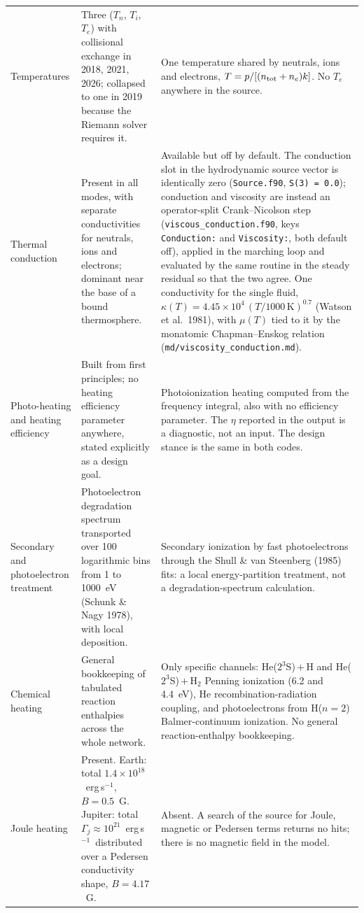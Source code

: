 \documentclass{my_memo}
\newcommand{\ergs}{erg\,s$^{-1}$}
\begin{document}
{\begin{longtable}{@{}L{0.155\textwidth}L{0.39\textwidth}L{0.39\textwidth}@{}}
Temperatures &
Three ($T_n$, $T_i$, $T_e$) with collisional exchange in 2018, 2021, 2026; collapsed to one in
2019 because the Riemann solver requires it. &
One temperature shared by neutrals, ions and electrons,
$T = p / [(n_{\rm tot} + n_e)k]$. No $T_e$ anywhere in the source. \\

Thermal conduction &
Present in all modes, with separate conductivities for neutrals, ions and electrons; dominant
near the base of a bound thermosphere. &
Available but off by default. The conduction slot in the hydrodynamic source vector is
identically zero (\texttt{Source.f90}, \texttt{S(3) = 0.0}); conduction and viscosity are
instead an operator-split Crank--Nicolson step
(\texttt{viscous\_conduction.f90}, keys \texttt{Conduction:} and \texttt{Viscosity:},
both default off), applied in the marching loop and evaluated by the same routine in the
steady residual so that the two agree. One conductivity for the single fluid,
$\kappa(T)=4.45\times10^{4}\,(T/1000\,\mathrm{K})^{0.7}$ (Watson et al.\ 1981), with
$\mu(T)$ tied to it by the monatomic Chapman--Enskog relation
(\texttt{md/viscosity\_conduction.md}). \\

Photo-heating and heating efficiency &
Built from first principles; no heating efficiency parameter anywhere, stated explicitly as a
design goal. &
Photoionization heating computed from the frequency integral, also with no efficiency parameter.
The $\eta$ reported in the output is a diagnostic, not an input. The design stance is the same in
both codes. \\

Secondary and photoelectron treatment &
Photoelectron degradation spectrum transported over 100 logarithmic bins from 1 to 1000~eV
(Schunk \& Nagy 1978), with local deposition. &
Secondary ionization by fast photoelectrons through the Shull \& van Steenberg (1985) fits: a
local energy-partition treatment, not a degradation-spectrum calculation. \\

Chemical heating &
General bookkeeping of tabulated reaction enthalpies across the whole network. &
Only specific channels: He($2^3$S)\,$+$\,H and He($2^3$S)\,$+$\,H$_2$ Penning ionization (6.2 and
4.4~eV), He recombination-radiation coupling, and photoelectrons from H($n=2$) Balmer-continuum
ionization. No general reaction-enthalpy bookkeeping. \\

Joule heating &
Present. Earth: total $1.4\times10^{18}$~\ergs, $B = 0.5$~G. Jupiter: total
$\Gamma_j \approx 10^{21}$~\ergs\ distributed over a Pedersen conductivity shape,
$B = 4.17$~G. &
Absent. A search of the source for Joule, magnetic or Pedersen terms returns no hits; there is
no magnetic field in the model. \\


\end{longtable}}
\end{document}
